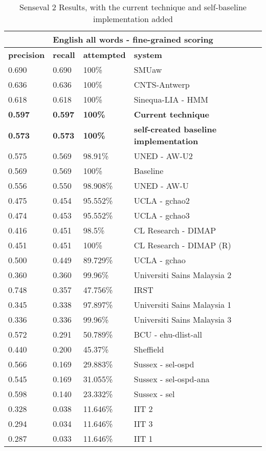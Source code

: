 \begin{table}[htpb]
	\centering 
	\begin{tabular}{|l|l|l|l|}
		\hline
		  \multicolumn{4}{|c|}{\bf English all words - fine-grained scoring } \\
		\hline
		{\bf precision } & {\bf recall} & {\bf attempted} & {\bf system} \\ \hline 
		0.690	&	0.690	&	100\%	&		SMUaw \\ \hline
		0.636	&	0.636	&	100\%	&		CNTS-Antwerp \\ \hline
		0.618	&	0.618	&	100\%	&		Sinequa-LIA - HMM \\ \hline
		
		{\bf 0.597} & {\bf 0.597} & {\bf 100\% } &	{\bf Current technique} \\ \hline	
		
		{\bf 0.573} & {\bf 0.573} & {\bf 100\%} &	{\bf self-created baseline implementation } \\ \hline
		0.575	&	0.569	&	98.91\% &		UNED - AW-U2 \\ \hline
		0.569	&	0.569	&	100\%		&	Baseline \\ \hline
		0.556	&	0.550	&	98.908\%	&	UNED - AW-U	 \\ \hline
		0.475	&	0.454	&	95.552\%	&	UCLA - gchao2 \\ \hline
		0.474	&	0.453	&	95.552\%	&	UCLA - gchao3 \\ \hline
		0.416	&	0.451	&	98.5\%		&	CL Research - DIMAP	 \\ \hline
		0.451	&	0.451	&	100\%		&	CL Research - DIMAP (R)	 \\ \hline
		0.500	&	0.449	&	89.729\%	&	UCLA - gchao \\ \hline
		0.360	&	0.360	&	99.96\%		&	Universiti Sains Malaysia 2	 \\ \hline
		0.748	&	0.357	&	47.756\%	&	IRST \\ \hline
		0.345	&	0.338	&	97.897\%	&	Universiti Sains Malaysia 1 \\ \hline
		0.336	&	0.336	&	99.96\%		&	Universiti Sains Malaysia 3 \\ \hline
		0.572	&	0.291	&	50.789\%	&	BCU - ehu-dlist-all \\ \hline
		0.440	&	0.200	&	45.37\%		&	Sheffield \\ \hline
		0.566	&	0.169	&	29.883\%	&	Sussex - sel-ospd \\ \hline
		0.545	&	0.169	&	31.055\%	&	Sussex - sel-ospd-ana \\ \hline
		0.598	&	0.140	&	23.332\%	&	Sussex - sel \\ \hline
		0.328	&	0.038	&	11.646\%	&	IIT 2 \\ \hline
		0.294	&	0.034	&	11.646\%	&	IIT 3 \\ \hline
		0.287	&	0.033	&	11.646\%	&	IIT 1 \\ \hline
	\end{tabular}
	\caption{Senseval 2 Results, with the current technique and self-baseline implementation added \label{table:SENSEVAL2RESULTS}}
\end{table}

